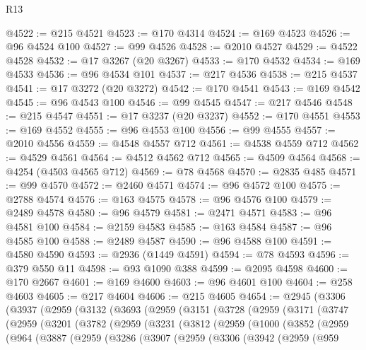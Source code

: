 \begin{lexlean}{R13}
\begin{coremodule}
@4522 := @215 @4521
@4523 := @170 @4314
@4524 := @169 @4523
@4526 := @96 @4524 @100
@4527 := @99 @4526
@4528 := @2010 @4527
@4529 := @4522 @4528
@4532 := @17 @3267 (@20 @3267)
@4533 := @170 @4532
@4534 := @169 @4533
@4536 := @96 @4534 @101
@4537 := @217 @4536
@4538 := @215 @4537
@4541 := @17 @3272 (@20 @3272)
@4542 := @170 @4541
@4543 := @169 @4542
@4545 := @96 @4543 @100
@4546 := @99 @4545
@4547 := @217 @4546
@4548 := @215 @4547
@4551 := @17 @3237 (@20 @3237)
@4552 := @170 @4551
@4553 := @169 @4552
@4555 := @96 @4553 @100
@4556 := @99 @4555
@4557 := @2010 @4556
@4559 := @4548 @4557 @712
@4561 := @4538 @4559 @712
@4562 := @4529 @4561
@4564 := @4512 @4562 @712
@4565 := @4509 @4564
@4568 := @4254 (@4503 @4565 @712)
@4569 := @78 @4568
@4570 := @2835 @485
@4571 := @99 @4570
@4572 := @2460 @4571
@4574 := @96 @4572 @100
@4575 := @2788 @4574
@4576 := @163 @4575
@4578 := @96 @4576 @100
@4579 := @2489 @4578
@4580 := @96 @4579
@4581 := @2471 @4571
@4583 := @96 @4581 @100
@4584 := @2159 @4583
@4585 := @163 @4584
@4587 := @96 @4585 @100
@4588 := @2489 @4587
@4590 := @96 @4588 @100
@4591 := @4580 @4590
@4593 := @2936 (@1449 @4591)
@4594 := @78 @4593
@4596 := @379 @550 @11
@4598 := @93 @1090 @388
@4599 := @2095 @4598
@4600 := @170 @2667
@4601 := @169 @4600
@4603 := @96 @4601 @100
@4604 := @258 @4603
@4605 := @217 @4604
@4606 := @215 @4605
@4654 := @2945
    (@3306
      (@3937
        (@2959
          (@3132
            (@3693
              (@2959
                (@3151
                  (@3728
                    (@2959
                      (@3171
                        (@3747
                          (@2959
                            (@3201
                              (@3782
                                (@2959
                                  (@3231
                                    (@3812
                                      (@2959
                                        (@1000
                                          (@3852
                                            (@2959
                                              (@964
                                                (@3887
                                                  (@2959
                                                    (@3286
                                                      (@3907
                                                        (@2959
                                                          (@3306
                                                            (@3942
                                                              (@2959
                                                                (@959

\end{coremodule}
\end{lexlean}
